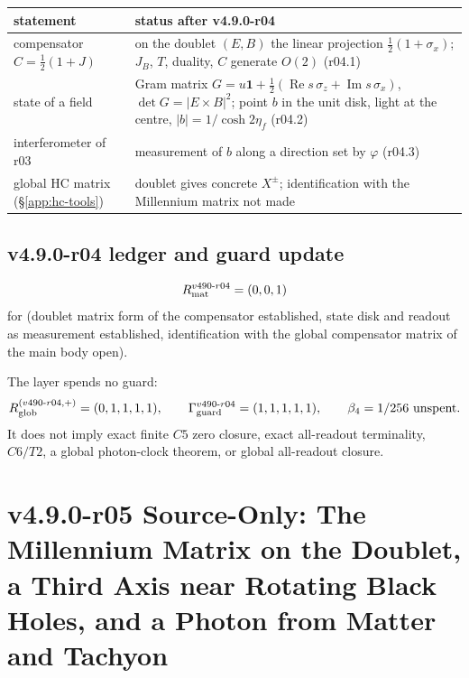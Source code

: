 \begin{center}
\small
\begin{tabular}{@{}>{\raggedright\arraybackslash}p{}>{\raggedright\arraybackslash}p{}@{}}
\toprule
statement & status after v4.9.0-r04\\
\midrule
compensator \(C=\tfrac12(1+J)\) & on the doublet \((E,B)\) the linear projection \(\tfrac12(1+\sigma_x)\); \(J_B\), \(T\), duality, \(C\) generate \(O(2)\) (r04.1)\\
state of a field & Gram matrix \(G=u\mathbf 1+\tfrac12(\operatorname{Re}s\,\sigma_z+\operatorname{Im}s\,\sigma_x)\), \(\det G=|E\times B|^2\); point \(b\) in the unit disk, light at the centre, \(|b|=1/\cosh2\eta_f\) (r04.2)\\
interferometer of r03 & measurement of \(b\) along a direction set by \(\varphi\) (r04.3)\\
global HC matrix (\S\ref{app:hc-tools}) & doublet gives concrete \(X^\pm\); identification with the Millennium matrix not made\\
\bottomrule
\end{tabular}
\end{center}

\subsection*{v4.9.0-r04 ledger and guard update}
\label{subsec:v490-r04-ledger-guard}

\[
R_{\rm mat}^{v490\text{-}r04}=(0,0,1)
\]
for (doublet matrix form of the compensator established, state disk and readout as measurement established,
identification with the global compensator matrix of the main body open).

The layer spends no guard:
\[
R_{\rm glob}^{(v490\text{-}r04,+)}=(0,1,1,1,1),
\qquad
\Gamma_{\rm guard}^{v490\text{-}r04}=(1,1,1,1,1),
\qquad
\beta_4=1/256\ \text{unspent}.
\]
It does not imply exact finite \(C5\) zero closure, exact all-readout terminality,
\(C6/T2\), a global photon-clock theorem, or global all-readout closure.

\clearpage
\section*{v4.9.0-r05 Source-Only: The Millennium Matrix on the Doublet, a Third Axis near Rotating Black Holes, and a Photon from Matter and Tachyon}
\label{sec:v490-r05-layer-transport-kerr-photon}

